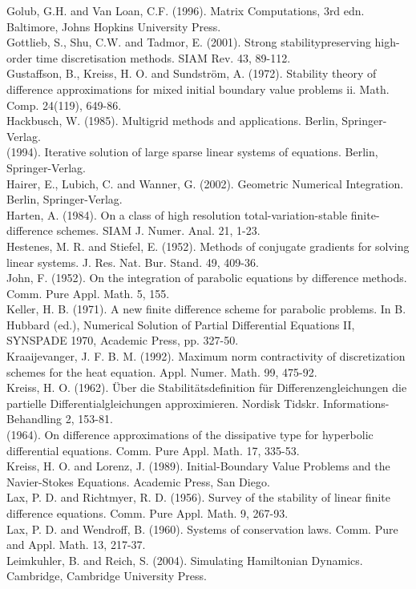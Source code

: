 \documentclass[10pt]{article}
\begin{document}
Golub, G.H. and Van Loan, C.F. (1996). Matrix Computations, 3rd edn. Baltimore, Johns Hopkins University Press.\\
Gottlieb, S., Shu, C.W. and Tadmor, E. (2001). Strong stabilitypreserving high-order time discretisation methods. SIAM Rev. 43, 89-112.\\
Gustaffson, B., Kreiss, H. O. and Sundström, A. (1972). Stability theory of difference approximations for mixed initial boundary value problems ii. Math. Comp. 24(119), 649-86.\\
Hackbusch, W. (1985). Multigrid methods and applications. Berlin, Springer-Verlag.\\
(1994). Iterative solution of large sparse linear systems of equations. Berlin, Springer-Verlag.\\
Hairer, E., Lubich, C. and Wanner, G. (2002). Geometric Numerical Integration. Berlin, Springer-Verlag.\\
Harten, A. (1984). On a class of high resolution total-variation-stable finite-difference schemes. SIAM J. Numer. Anal. 21, 1-23.\\
Hestenes, M. R. and Stiefel, E. (1952). Methods of conjugate gradients for solving linear systems. J. Res. Nat. Bur. Stand. 49, 409-36.\\
John, F. (1952). On the integration of parabolic equations by difference methods. Comm. Pure Appl. Math. 5, 155.\\
Keller, H. B. (1971). A new finite difference scheme for parabolic problems. In B. Hubbard (ed.), Numerical Solution of Partial Differential Equations II, SYNSPADE 1970, Academic Press, pp. 327-50.\\
Kraaijevanger, J. F. B. M. (1992). Maximum norm contractivity of discretization schemes for the heat equation. Appl. Numer. Math. 99, 475-92.\\
Kreiss, H. O. (1962). Über die Stabilitätsdefinition für Differenzengleichungen die partielle Differentialgleichungen approximieren. Nordisk Tidskr. Informations-Behandling 2, 153-81.\\
(1964). On difference approximations of the dissipative type for hyperbolic differential equations. Comm. Pure Appl. Math. 17, 335-53.\\
Kreiss, H. O. and Lorenz, J. (1989). Initial-Boundary Value Problems and the Navier-Stokes Equations. Academic Press, San Diego.\\
Lax, P. D. and Richtmyer, R. D. (1956). Survey of the stability of linear finite difference equations. Comm. Pure Appl. Math. 9, 267-93.\\
Lax, P. D. and Wendroff, B. (1960). Systems of conservation laws. Comm. Pure and Appl. Math. 13, 217-37.\\
Leimkuhler, B. and Reich, S. (2004). Simulating Hamiltonian Dynamics. Cambridge, Cambridge University Press.
\end{document}
